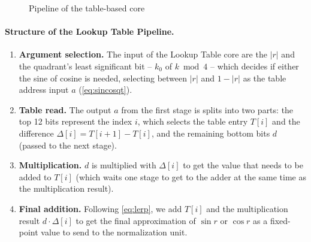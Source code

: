 \begin{figure}[H]
{%
  }
  \caption{Pipeline of the table-based core}
  \label{fig:lut-core}
\end{figure}

\paragraph{Structure of the Lookup Table Pipeline. }
\label{pa:struc-lut}

\begin{enumerate}[label=\textbf{Stage \arabic*.}, ref=\arabic*, leftmargin=*]
  \item \textbf{Argument selection.} The input of the Lookup Table core are the $|r|$
    and the quadrant's least significant bit -- $k_{0}$ of $k \bmod 4$ -- which
    decides if either the sine of cosine is needed, selecting between $|r|$ and
    $1 - |r|$ as the table address input $a$ (\cref{eq:sincosqt}).
  \item \textbf{Table read.} The output $a$ from the first stage is splits into
    two parts: the top 12 bits represent the index $i$, which selects the table
    entry $T[i]$ and the difference $\Delta[i] = T[i+1] - T[i]$, and the remaining
    bottom bits $d$ (passed to the next stage).
  \item \textbf{Multiplication.} $d$ is multiplied with $\Delta[i]$ to get the value
    that needs to be added to $T[i]$ (which waits one stage to get to the adder at
    the same time as the multiplication result).
  \item \textbf{Final addition.} Following \cref{eq:lerp}, we add $T[i]$ and the
    multiplication result $d \cdot \Delta[i]$ to get the final approximation of $\sin r$ or $\cos r$
    as a fixed-point value to send to the normalization unit.
\end{enumerate}

